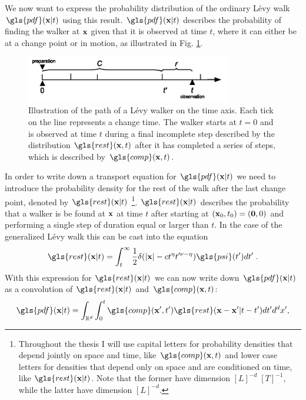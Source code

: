 We now want to express the probability distribution of the ordinary L\'evy walk $\gls{pdf}(\ve{x}|t)$ using this result. $\gls{pdf}(\ve{x}|t)$ describes the probability of finding the walker at $\mathbf{ x }$ given that it is observed at time $t$, where it can either be at a change point or in motion, as illustrated in Fig. \ref{fig:pdfOrdinary}. 
%
\begin{figure}
\begin{center}
\includegraphics[width=90mm]{pics/timelineOrdinary.png}
\caption{Illustration of the path of a L\'evy walker on the time axis. Each tick on the line represents a change time. The walker starts at $t=0$ and is observed at time $t$ during a final incomplete step described by the distribution $\gls{rest}(\ve{x},t)$ after it has completed a series of steps, which is described by $\gls{comp}(\ve{x},t)$. 
\label{fig:pdfOrdinary}}
\end{center}
\end{figure}
%
In order to write down a transport equation for $\gls{pdf}(\ve{x}|t)$ we need to introduce the probability density for the rest of the walk after the last change point, denoted by $\gls{rest}(\ve{x}|t)$
\footnote{
Throughout the thesis I will use capital letters for probability densities that depend jointly on space and time, like $\gls{comp}(\ve{x},t)$ and lower case letters for densities that depend only on space and are conditioned on time, like $\gls{rest}(\ve{x}|t)$. Note that the former have dimension $[L]^{-d} \; [T]^{-1}$, while the latter have dimension $[L]^{-d}$.
}. 
$\gls{rest}(\ve{x}|t)$ describes the probability that a walker is be found at $\mathbf{ x }$ at time $t$ after starting at $(\mathbf{ x }_0,t_0) =(\mathbf{ 0 },0)$ and performing a single step of duration equal or larger than $t$. In the case of the generalized L\'evy walk this can be cast into the equation
%
\begin{align}
 \gls{rest}(\ve{x}|t) =  \int_t^\infty \frac{1}{2} \delta(|\ve{x}| - c t^{\eta}t'^{\nu-\eta}) \gls{psi}(t') dt' \; \label{eqn:defR} .
\end{align}
%
With this expression for $\gls{rest}(\ve{x}|t)$ we can now write down $\gls{pdf}(\ve{x}|t)$ as a convolution of $\gls{rest}(\ve{x}|t)$ and $\gls{comp}(\ve{x},t)$:
%
\begin{align}
\gls{pdf}(\ve{x}|t) = \int_{\mathbb{R}^{d}} \int_0^t  \gls{comp}(\ve{x}',t') \gls{rest}(\ve{x}-\ve{x}'|t-t') d t' d^{d}x' ,
\end{align}
